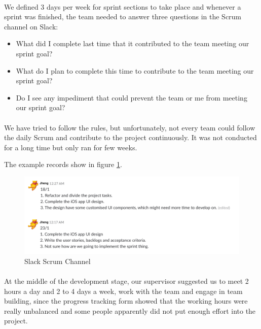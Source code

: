 \documentclass[12pt,a4paper]{article}
\begin{document}
          \paragraph{}We defined 3 days per week for sprint sections to take place and whenever a sprint was finished, the team needed to answer three questions in the Scrum channel on Slack:
          
          \begin{itemize}
            \item What did I complete last time that it contributed to the team meeting our sprint goal?
            \item What do I plan to complete this time to contribute to the team meeting our sprint goal?
            \item Do I see any impediment that could prevent the team or me from meeting our sprint goal?
          \end{itemize}    

          \paragraph{} We have tried to follow the rules, but unfortunately, not every team could follow the daily Scrum and contribute to the project continuously. It was not conducted for a long time but only ran for few weeks. 
          
          The example records show in figure \ref{fig:Slack Scrum Channel}. 

          \begin{figure}[H]
            \centering
            \includegraphics[width=1\textwidth]{../assets/development-records-slack-scrum-channel.png}
            \caption{Slack Scrum Channel}
            \label{fig:Slack Scrum Channel}
          \end{figure}
          
          \paragraph{}At the middle of the development stage, our supervisor suggested us to meet 2 hours a day and 2 to 4 days a week, work with the team and engage in team building, since the progress tracking form showed that the working hours were really unbalanced and some people apparently did not put enough effort into the project. 
          
\end{document}
